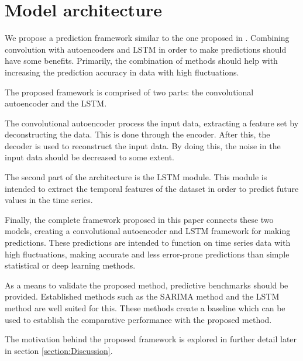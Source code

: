 \section{Model architecture}
\label{section:Architecture:Model}

We propose a prediction framework similar to the one proposed in \cite{Zhao2019}.
Combining convolution with autoencoders and LSTM in order to make predictions should have some benefits.
Primarily, the combination of methods should help with increasing the prediction accuracy in data with high fluctuations.

The proposed framework is comprised of two parts: the convolutional autoencoder and the LSTM.


The convolutional autoencoder process the input data, extracting a feature set by deconstructing the data.
This is done through the encoder. After this, the decoder is used to reconstruct the input data.
By doing this, the noise in the input data should be decreased to some extent.

The second part of the architecture is the LSTM module.
This module is intended to extract the temporal features of the dataset
in order to predict future values in the time series.


Finally, the complete framework proposed in this paper connects these two models,
creating a convolutional autoencoder and LSTM framework for making predictions.
These predictions are intended to function on time series data with high fluctuations,
making accurate and less error-prone predictions than simple statistical or deep learning methods.


As a means to validate the proposed method, predictive benchmarks should be provided.
Established methods such as the SARIMA method and the LSTM method are well suited for this.
These methods create a baseline which can be used to establish the comparative performance with the proposed method.

The motivation behind the proposed framework is explored in further detail later in section \ref{section:Discussion}.

